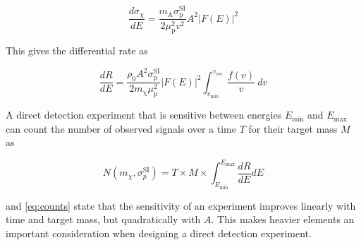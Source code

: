 \begin{equation}
\frac{d \sigma_{\chi}}{dE} = \frac{m_{\mathrm{A}} \sigma_{\mathrm{p}}^{\mathrm{SI}}}{2 \mu_{\mathrm{p}}^{2} v^{2}}
 A^{2} \big| F(E) \big |^{2}
\end{equation}

\noindent This gives the differential rate as 

\begin{equation}
\frac{dR}{dE} = \frac{\rho_{0} A^{2} \sigma_{\mathrm{p}}^{\mathrm{SI}}}{2 m_{\mathrm{\chi}} \mu_{\mathrm{p}}^{2}}
  \big| F(E) \big |^{2} \int_{v_{\mathrm{min}}}^{v_{\mathrm{esc}}}
\frac{f(v)}{v}\ dv
\label{eq:dr_de_final}
\end{equation}

\noindent A direct detection experiment that is sensitive between energies $E_{\mathrm{min}}$ and $E_{\mathrm{max}}$ can count the number
of observed signals over a time $T$ for their target mass $M$ as

\begin{equation} \label{eq:counts}
N ( m_{\chi}, \sigma_{p}^{\mathrm{SI}}) = T \times M \times \int_{E_{\mathrm{min}}}^{E_{\mathrm{max}}} \frac{dR}{dE} dE
\end{equation}

\noindent {} and \eqref{eq:counts} state that the sensitivity of an experiment improves linearly with time and
target mass, but quadratically with $A$.  This makes heavier elements an important consideration when designing a direct detection
experiment.












